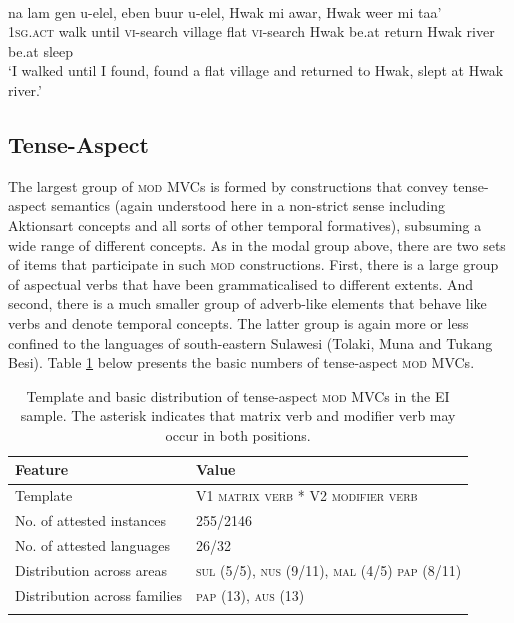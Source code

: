 \ea \label{Klon_99b}
\\
\gll na lam gen u-elel, eben buur u-elel, Hwak mi awar, Hwak weer mi taa' \\
1\textsc{sg}.\textsc{act} walk until \textsc{vi}-search village flat \textsc{vi}-search Hwak be.at return Hwak river be.at sleep \\
\glft `I walked until I found, found a flat village and returned to Hwak, slept at Hwak river.'\\ 
\z

\subsection{Tense-Aspect}

The largest group of \textsc{mod} MVCs is formed by constructions that convey tense-aspect semantics (again understood here in a non-strict sense including Aktionsart concepts and all sorts of other temporal formatives), subsuming a wide range of different concepts. As in the modal group above, there are two sets of items that participate in such \textsc{mod} constructions. First, there is a large group of aspectual verbs that have been grammaticalised to different extents. And second, there is a much smaller group of adverb-like elements that behave like verbs and denote temporal concepts. The latter group is again more or less confined to the languages of south-eastern Sulawesi (Tolaki, Muna and Tukang Besi). Table \ref{table:tense-aspect} below presents the basic numbers of tense-aspect \textsc{mod} MVCs.

\begin{table}
\begin{tabular}{ll}
\lsptoprule
Feature&Value\tabularnewline
\midrule
Template&V1 \textsc{matrix verb} * V2 \textsc{modifier verb}\tabularnewline
No. of attested instances& 255/2146 \tabularnewline
No. of attested languages& 26/32 \tabularnewline
Distribution across areas& \textsc{sul} (5/5), \textsc{nus} (9/11), \textsc{mal} (4/5) \textsc{pap} (8/11) \tabularnewline
Distribution across families& \textsc{pap} (13), \textsc{aus} (13) \tabularnewline
\lspbottomrule
\end{tabular}
\caption[Template and basic distribution of tense-aspect \textsc{mod} MVCs]{Template and basic distribution of tense-aspect \textsc{mod} MVCs in the EI sample. The asterisk indicates that matrix verb and modifier verb may occur in both positions.}
\label{table:tense-aspect}
\end{table}


